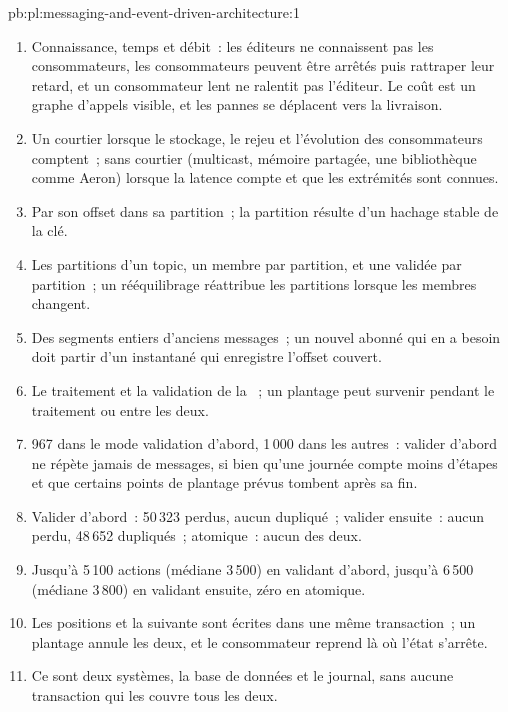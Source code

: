 \begin{solution}{pb:pl:messaging-and-event-driven-architecture:1}
\begin{enumerate}
\item Connaissance, temps et débit~: les éditeurs ne connaissent pas les consommateurs, les consommateurs peuvent être arrêtés puis rattraper leur retard, et un consommateur lent
ne ralentit pas l'éditeur. Le coût est un graphe d'appels visible, et les pannes se déplacent vers la livraison.
\item Un courtier lorsque le stockage, le rejeu et l'évolution des consommateurs comptent~; sans courtier (multicast, mémoire partagée, une bibliothèque comme Aeron) lorsque la
latence compte et que les extrémités sont connues.
\item Par son offset dans sa partition~; la partition résulte d'un hachage stable de la clé.
\item Les partitions d'un topic, un membre par partition, et une  validée par partition~; un rééquilibrage réattribue les partitions lorsque les membres changent.
\item Des segments entiers d'anciens messages~; un nouvel abonné qui en a besoin doit partir d'un instantané qui enregistre l'offset couvert.
\item Le traitement et la validation de la ~; un plantage peut survenir pendant le traitement ou entre les deux.
\item 967 dans le mode validation d'abord, 1\,000 dans les autres~: valider d'abord ne répète jamais de messages, si bien qu'une journée compte moins d'étapes et que certains
points de plantage prévus tombent après sa fin.
\item Valider d'abord~: 50\,323 perdus, aucun dupliqué~; valider ensuite~: aucun perdu, 48\,652 dupliqués~; atomique~: aucun des deux.
\item Jusqu'à 5\,100 actions (médiane 3\,500) en validant d'abord, jusqu'à 6\,500 (médiane 3\,800) en validant ensuite, zéro en atomique.
\item Les positions et la  suivante sont écrites dans une même transaction~; un plantage annule les deux, et le consommateur reprend là où l'état
s'arrête.
\item Ce sont deux systèmes, la base de données et le journal, sans aucune transaction qui les couvre tous les deux.

\end{enumerate}
\end{solution}
